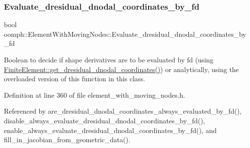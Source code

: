 \mbox{\label{classoomph_1_1ElementWithMovingNodes_a48a91f84864bc2346ee4b9d50d2250b1}} 
\subsubsection{\texorpdfstring{Evaluate\+\_\+dresidual\+\_\+dnodal\+\_\+coordinates\+\_\+by\+\_\+fd}{Evaluate\_dresidual\_dnodal\_coordinates\_by\_fd}}
{\footnotesize\ttfamily bool oomph\+::\+Element\+With\+Moving\+Nodes\+::\+Evaluate\+\_\+dresidual\+\_\+dnodal\+\_\+coordinates\+\_\+by\+\_\+fd\hspace{0.3cm}{\ttfamily [private]}}



Boolean to decide if shape derivatives are to be evaluated by fd (using \hyperlink{classoomph_1_1FiniteElement_ae4b85a31a983a52d3010930f9e0851b8}{Finite\+Element\+::get\+\_\+dresidual\+\_\+dnodal\+\_\+coordinates()}) or analytically, using the overloaded version of this function in this class. 



Definition at line 360 of file element\+\_\+with\+\_\+moving\+\_\+nodes.\+h.



Referenced by are\+\_\+dresidual\+\_\+dnodal\+\_\+coordinates\+\_\+always\+\_\+evaluated\+\_\+by\+\_\+fd(), disable\+\_\+always\+\_\+evaluate\+\_\+dresidual\+\_\+dnodal\+\_\+coordinates\+\_\+by\+\_\+fd(), enable\+\_\+always\+\_\+evaluate\+\_\+dresidual\+\_\+dnodal\+\_\+coordinates\+\_\+by\+\_\+fd(), and fill\+\_\+in\+\_\+jacobian\+\_\+from\+\_\+geometric\+\_\+data().

\mbox{\label{classoomph_1_1ElementWithMovingNodes_a18986c6ad81149cf779a2d930825dad5}} 
